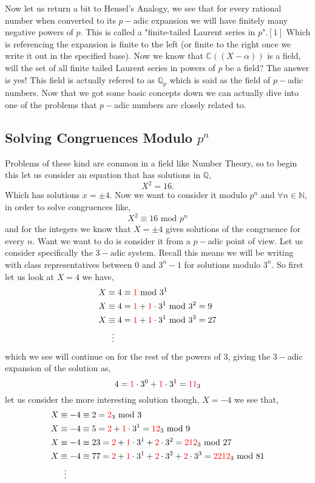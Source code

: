 \documentclass[12pt]{article}
\theoremstyle{definition}
\theoremstyle{remark}
\newcommand{\qq}{\mathbb Q}   %
\newcommand{\nn}{\mathbb N}   %
\newcommand{\cc}{\mathbb C}   %
\newcommand{\lrp}[1]{\left(#1\right)}
\newcommand{\lrb}[1]{\left[#1\right]}
\newcommand{\tcr}[1]{\textcolor{red}{#1}}
\begin{document}
Now let us return a bit to Hensel's Analogy, we see that for every rational number when converted to its $p-$adic expansion we will have finitely many negative powers of $p$. This is called a "finite-tailed Laurent series in $p$".$\lrb{1}$ Which is referencing the expansion is finite to the left (or finite to the right once we write it out in the specified base). Now we know that $\cc\lrp{\lrp{X - \alpha}}$ is a field, will the set of all finite tailed Laurent series in powers of $p$ be a field? The answer is yes! This field is actually refered to as $\qq_p$ which is said as the field of $p-$adic numbers.  Now that we got some basic concepts down we can actually dive into one of the problems that $p-$adic numbers are closely related to. 

\subsection{Solving Congruences Modulo $p^{n}$}
  Problems of these kind are common in a field like Number Theory, so to begin this let us consider an equation that has solutions in $\qq$,
  \[X^{2} = 16.\]
  Which has solutions $x = \pm 4$. Now we want to consider it modulo $p^{n}$ and $\forall n \in \nn$, in order to solve congruences like,
  \[X^{2} \equiv 16\text{ mod } p^{n}\]
  and for the integers we know that $X = \pm 4$ gives solutions of the congruence for every $n$. Want we want to do is consider it from a $p-$adic point of view. Let us consider specifically the $3-$adic system. Recall this means we will be writing with class representatives between 0 and $3^{n} -1$ for solutions modulo $3^{n}$. So first let us look at $X = 4$ we have,
  \begin{align*}
    X &\equiv 4 \equiv \tcr{1} \text{ mod }3^{1} \\
    X &\equiv 4 = \tcr{1} + \tcr{1}\cdot 3^{1} \text{ mod }3^{2} = 9 \\
    X &\equiv 4 = \tcr{1} + \tcr{1}\cdot 3^{1} \text{ mod }3^{3} = 27 \\
    & \ \  \vdots 
  \end{align*} which we see will continue on for the rest of the powers of $3$, giving the $3-$adic expansion of the solution as,
  \[4 = \tcr{1}\cdot 3^{0} + \tcr{1}\cdot 3^{1} = \tcr{11}_3\]
  let us consider the more interesting solution though, $X = -4$ we see that,
  \begin{align*}
    X&\equiv -4 \equiv 2  = \tcr{2}_3 \text{ mod } 3 \\ 
    X &\equiv -4 \equiv 5 = \tcr{2} + \tcr{1}\cdot 3^{1} = \tcr{12}_3 \text{ mod } 9 \\ 
    X & \equiv -4 \equiv 23 = \tcr{2} + \tcr{1} \cdot 3^{1} + \tcr{2}\cdot 3^{2} = \tcr{212}_3 \text{ mod } 27 \\
    X &\equiv -4 \equiv 77 = \tcr{2} + \tcr{1}\cdot 3^{1} + \tcr{2}\cdot 3^{2} + \tcr{2}\cdot 3^{3} = \tcr{2212}_3 \text{ mod } 81 \\
    & \ \ \vdots 
  \end{align*}
\end{document}

